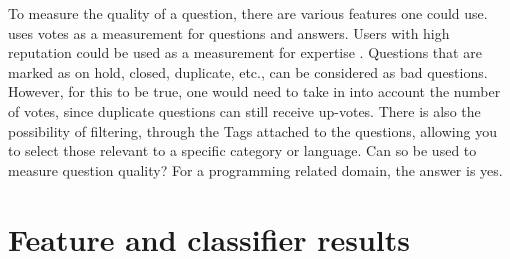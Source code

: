 To measure the quality of a question, there are various features one could use. 
\textcite{M.Sewak2010} uses votes as a measurement for questions and answers.
Users with high reputation could be used as a measurement for expertise \cite{Movshovitz-Attias2013}.
Questions that are marked as on hold, closed, duplicate, etc., can be considered as bad questions.
However, for this to be true, one would need to take in into account the number of votes, since duplicate questions can still receive up-votes.
There is also the possibility of filtering, through the Tags attached to the questions, allowing you to select those relevant to a specific category or language.
Can \gls{so} be used to measure question quality?
For a programming related domain, the answer is yes.

\begin{comment}
The same can be said for bad questions. 
In many cases, a question is bad not because of the question that is asked, but simply because it does not follow the guidelines. 
If a question is a duplicate, it is automatically voted for closure, and will in most cases receive multiple down-votes. 
Questions which gives a hint of being school related will also receive down-votes, mainly because \gls{so} targets professionals and experts. 
\gls{so} is neither a fan of unnecessary text like greetings and gratefulness \cite{CommunityWiki2016a,Heyer2012}.
Is \gls{so} fit for measuring question quality?
In a closed domain setting, the answer is yes. 
However, as mentioned, what type of quality being measured must be taken into consideration. 
As it is, the system would not be useful for an educational setting, because it bases its prediction on questions asked on \gls{so}.
If a student were to ask the system a question, it might respond saying that this is a bad question (but the result may be based on the fact that it is a duplicate).
For an educational setting, a better solution would be to develop a system similar to the one in \cite{Lezina2013}.
With the current state of the system (if it were to be used), it would be more appropriate to use it as a measurement tool for new \gls{so} questions, rather then general question quality.
\end{comment}

\section{Feature and classifier results}
\label{sec:feature_classifier_results}

